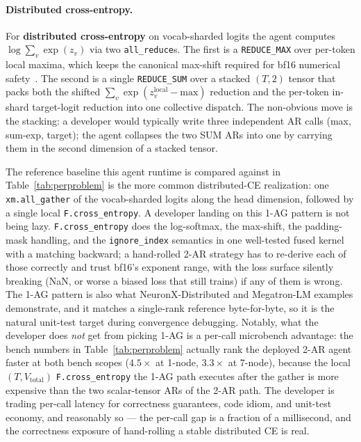 \paragraph{Distributed cross-entropy.} For \textbf{distributed
cross-entropy} on vocab-sharded logits the agent computes
$\log\sum_v\exp(z_v)$ via two \texttt{all\_reduce}s. The first
is a \texttt{REDUCE\_MAX} over per-token local maxima, which
keeps the canonical max-shift required for bf16
numerical safety~\cite{kalamkar2019bf16, micikevicius2018mixed}.
The second is a single \texttt{REDUCE\_SUM} over a stacked
$(T, 2)$ tensor that packs both the shifted
$\sum_v\exp(z_v^{\text{local}} - \text{max})$ reduction and the
per-token in-shard target-logit reduction into one collective
dispatch. The non-obvious move is the stacking: a developer would
typically write three independent AR calls
(max, sum-exp, target); the agent collapses the two SUM ARs
into one by carrying them in the second dimension of a stacked
tensor.

The reference baseline this agent runtime is compared against in
Table~\ref{tab:perproblem} is the more common
distributed-CE realization: one \texttt{xm.all\_gather} of the
vocab-sharded logits along the head dimension, followed by a
single local \texttt{F.cross\_entropy}. A developer landing on
this 1-AG pattern is not being lazy. \texttt{F.cross\_entropy} does
the log-softmax, the max-shift, the padding-mask handling, and the
\texttt{ignore\_index} semantics in one
well-tested fused kernel with a matching backward;
a hand-rolled 2-AR strategy has to re-derive each of those
correctly and trust bf16's exponent range, with the loss surface
silently breaking
(NaN, or worse a biased loss that still trains) if any of them is
wrong. The 1-AG pattern is also what NeuronX-Distributed and
Megatron-LM examples demonstrate, and it matches a single-rank
reference byte-for-byte, so it is the natural unit-test target
during convergence debugging. Notably, what the developer does \emph{not} get from picking 1-AG
is a per-call microbench advantage: the bench numbers in
Table~\ref{tab:perproblem} actually rank the deployed 2-AR agent
faster at both bench scopes ($4.5\times$ at 1-node, $3.3\times$
at 7-node), because the local $(T, V_\text{total})$
\texttt{F.cross\_entropy} the 1-AG path executes after the gather
is more expensive than the two scalar-tensor ARs of the 2-AR
path. The developer is trading per-call latency for correctness
guarantees, code idiom, and unit-test economy, and reasonably so
--- the per-call gap is a fraction of a millisecond, and the
correctness exposure of hand-rolling a stable distributed CE is
real.

